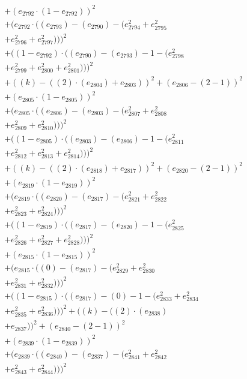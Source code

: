 \documentclass[10pt, a4paper]{article}
\begin{document}
\begin{align*}
& + (e_{2792}  \cdot  (1 - e_{2792}))^{2} \\
& + (e_{2792}  \cdot  ((e_{2793}) - (e_{2790}) - (e_{2794}^{2} + e_{2795}^{2} \\
& + e_{2796}^{2} + e_{2797}^{2})))^{2} \\
& + ((1 - e_{2792})  \cdot  ((e_{2790}) - (e_{2793}) - 1 - (e_{2798}^{2} \\
& + e_{2799}^{2} + e_{2800}^{2} + e_{2801}^{2})))^{2} \\
& + ((k) - ((2)  \cdot  (e_{2804}) + e_{2803}))^{2} + (e_{2806} - (2 - 1))^{2} \\
& + (e_{2805}  \cdot  (1 - e_{2805}))^{2} \\
& + (e_{2805}  \cdot  ((e_{2806}) - (e_{2803}) - (e_{2807}^{2} + e_{2808}^{2} \\
& + e_{2809}^{2} + e_{2810}^{2})))^{2} \\
& + ((1 - e_{2805})  \cdot  ((e_{2803}) - (e_{2806}) - 1 - (e_{2811}^{2} \\
& + e_{2812}^{2} + e_{2813}^{2} + e_{2814}^{2})))^{2} \\
& + ((k) - ((2)  \cdot  (e_{2818}) + e_{2817}))^{2} + (e_{2820} - (2 - 1))^{2} \\
& + (e_{2819}  \cdot  (1 - e_{2819}))^{2} \\
& + (e_{2819}  \cdot  ((e_{2820}) - (e_{2817}) - (e_{2821}^{2} + e_{2822}^{2} \\
& + e_{2823}^{2} + e_{2824}^{2})))^{2} \\
& + ((1 - e_{2819})  \cdot  ((e_{2817}) - (e_{2820}) - 1 - (e_{2825}^{2} \\
& + e_{2826}^{2} + e_{2827}^{2} + e_{2828}^{2})))^{2} \\
& + (e_{2815}  \cdot  (1 - e_{2815}))^{2} \\
& + (e_{2815}  \cdot  ((0) - (e_{2817}) - (e_{2829}^{2} + e_{2830}^{2} \\
& + e_{2831}^{2} + e_{2832}^{2})))^{2} \\
& + ((1 - e_{2815})  \cdot  ((e_{2817}) - (0) - 1 - (e_{2833}^{2} + e_{2834}^{2} \\
& + e_{2835}^{2} + e_{2836}^{2})))^{2} + ((k) - ((2)  \cdot  (e_{2838}) \\
& + e_{2837}))^{2} + (e_{2840} - (2 - 1))^{2} \\
& + (e_{2839}  \cdot  (1 - e_{2839}))^{2} \\
& + (e_{2839}  \cdot  ((e_{2840}) - (e_{2837}) - (e_{2841}^{2} + e_{2842}^{2} \\
& + e_{2843}^{2} + e_{2844}^{2})))^{2} \\

\end{align*}
\end{document}
